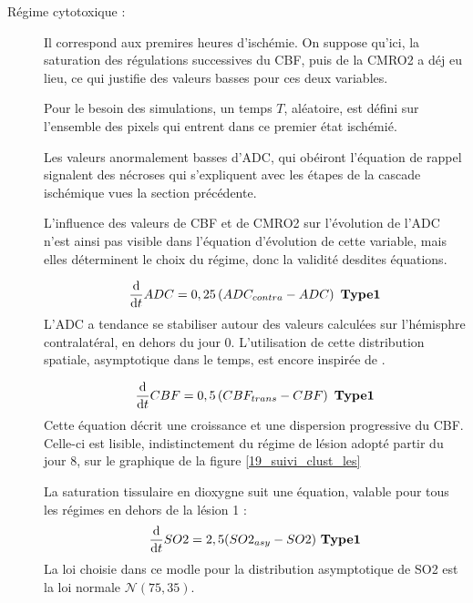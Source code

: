 \begin{description}
\item[R\'egime cytotoxique :] Il correspond aux premires heures d'isch\'emie. %
On suppose qu'ici, la saturation des r\'egulations successives du CBF, puis de la CMRO2 a d\'ej eu lieu, ce qui justifie des valeurs basses pour ces deux variables.

\par
Pour le besoin des simulations, un temps $T$, al\'eatoire, est d\'efini sur l'ensemble des pixels qui entrent dans ce premier \'etat isch\'emi\'e.

\par
Les valeurs anormalement basses d'ADC, qui ob\'eiront  l'\'equation de rappel %
signalent des n\'ecroses qui s'expliquent avec les \'etapes de la cascade isch\'emique vues  la section pr\'ec\'edente.

\par
L'influence des valeurs de CBF et de CMRO2 sur l'\'evolution de l'ADC n'est ainsi pas visible dans l'\'equation d'\'evolution de cette variable, %
mais elles d\'eterminent le choix du r\'egime, donc la validit\'e desdites \'equations.

\begin{equation}
\frac{\text{d}}{\text{d}t}ADC=0,25\left(ADC_{contra}-ADC\right) \ \mathbf{Type 1}
\label{adc_is1}
\end{equation}
L'ADC a tendance  se stabiliser autour des valeurs calcul\'ees sur l'h\'emisphre contralat\'eral, en dehors du jour 0. %
L'utilisation de cette distribution spatiale, asymptotique dans le temps, est encore inspir\'ee de \cite{Duval_JCBFM_02}.

\begin{equation}
\frac{\text{d}}{\text{d}t}CBF=0,5\left(CBF_{trans}-CBF\right) \ \mathbf{Type 1}
\label{cbf_is1}
\end{equation}
Cette \'equation d\'ecrit une croissance et une dispersion progressive du CBF. %
Celle-ci est lisible, indistinctement du r\'egime de l\'esion adopt\'e  partir du jour 8, %
sur le graphique de la figure \ref{19_suivi_clust_les}

La saturation tissulaire en dioxygne suit une \'equation, valable pour tous les r\'egimes en dehors de la \og{} l\'esion 1\fg{} :
\begin{equation}
\frac{\text{d}}{\text{d}t}SO2=2,5(SO2_{asy}-SO2) \ \mathbf{Type 1}
\label{so2_s_l2}
\end{equation}
La loi choisie dans ce modle pour la distribution asymptotique de SO2 est la loi normale $\mathcal{N}(75,35)$.


\end{description}
